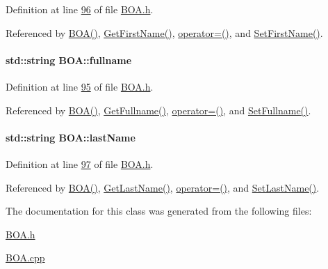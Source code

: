 Definition at line \hyperlink{_b_o_a_8h_source_l00096}{96} of file \hyperlink{_b_o_a_8h_source}{B\+O\+A.\+h}.



Referenced by \hyperlink{_b_o_a_8h_source_l00024}{B\+O\+A()}, \hyperlink{_b_o_a_8cpp_source_l00096}{Get\+First\+Name()}, \hyperlink{_b_o_a_8h_source_l00064}{operator=()}, and \hyperlink{_b_o_a_8cpp_source_l00092}{Set\+First\+Name()}.

\paragraph[{\texorpdfstring{fullname}{fullname}}]{\setlength{\rightskip}{0pt plus 5cm}std\+::string B\+O\+A\+::fullname\hspace{0.3cm}{\ttfamily [private]}}\hypertarget{class_b_o_a_aed3225e383c08b1b7c962a0e43b180d1_aed3225e383c08b1b7c962a0e43b180d1}{}\label{class_b_o_a_aed3225e383c08b1b7c962a0e43b180d1_aed3225e383c08b1b7c962a0e43b180d1}


Definition at line \hyperlink{_b_o_a_8h_source_l00095}{95} of file \hyperlink{_b_o_a_8h_source}{B\+O\+A.\+h}.



Referenced by \hyperlink{_b_o_a_8h_source_l00024}{B\+O\+A()}, \hyperlink{_b_o_a_8cpp_source_l00104}{Get\+Fullname()}, \hyperlink{_b_o_a_8h_source_l00064}{operator=()}, and \hyperlink{_b_o_a_8cpp_source_l00100}{Set\+Fullname()}.

\paragraph[{\texorpdfstring{last\+Name}{lastName}}]{\setlength{\rightskip}{0pt plus 5cm}std\+::string B\+O\+A\+::last\+Name\hspace{0.3cm}{\ttfamily [private]}}\hypertarget{class_b_o_a_ab7749e6e945beaca57a3ef01259c6fea_ab7749e6e945beaca57a3ef01259c6fea}{}\label{class_b_o_a_ab7749e6e945beaca57a3ef01259c6fea_ab7749e6e945beaca57a3ef01259c6fea}


Definition at line \hyperlink{_b_o_a_8h_source_l00097}{97} of file \hyperlink{_b_o_a_8h_source}{B\+O\+A.\+h}.



Referenced by \hyperlink{_b_o_a_8h_source_l00024}{B\+O\+A()}, \hyperlink{_b_o_a_8cpp_source_l00088}{Get\+Last\+Name()}, \hyperlink{_b_o_a_8h_source_l00064}{operator=()}, and \hyperlink{_b_o_a_8cpp_source_l00084}{Set\+Last\+Name()}.



The documentation for this class was generated from the following files\+:\begin{DoxyCompactItemize}
\item 
\hyperlink{_b_o_a_8h}{B\+O\+A.\+h}\item 
\hyperlink{_b_o_a_8cpp}{B\+O\+A.\+cpp}\end{DoxyCompactItemize}
